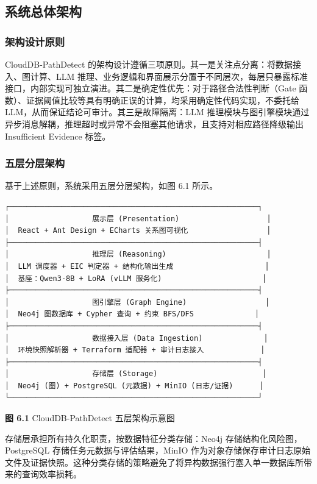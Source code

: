 \documentclass[a4paper,12pt]{ctexart}
\begin{document}
\subsection{系统总体架构}

\subsubsection{架构设计原则}

CloudDB-PathDetect 的架构设计遵循三项原则。其一是关注点分离：将数据接入、图计算、LLM 推理、业务逻辑和界面展示分置于不同层次，每层只暴露标准接口，内部实现可独立演进。其二是确定性优先：对于路径合法性判断（Gate 函数）、证据阈值比较等具有明确正误的计算，均采用确定性代码实现，不委托给 LLM，从而保证结论可审计。其三是故障隔离：LLM 推理模块与图引擎模块通过异步消息解耦，推理超时或异常不会阻塞其他请求，且支持对相应路径降级输出 Insufficient Evidence 标签。

\subsubsection{五层分层架构}

基于上述原则，系统采用五层分层架构，如图 6.1 所示。

\begin{verbatim}
┌─────────────────────────────────────────────────────────┐
│                   展示层 (Presentation)                    │
│  React + Ant Design + ECharts 关系图可视化                  │
├─────────────────────────────────────────────────────────┤
│                   推理层 (Reasoning)                       │
│  LLM 调度器 + EIC 判定器 + 结构化输出生成                     │
│  基座：Qwen3-8B + LoRA (vLLM 服务化)                       │
├─────────────────────────────────────────────────────────┤
│                   图引擎层 (Graph Engine)                  │
│  Neo4j 图数据库 + Cypher 查询 + 约束 BFS/DFS              │
├─────────────────────────────────────────────────────────┤
│                   数据接入层 (Data Ingestion)              │
│  环境快照解析器 + Terraform 适配器 + 审计日志接入             │
├─────────────────────────────────────────────────────────┤
│                   存储层 (Storage)                        │
│  Neo4j (图) + PostgreSQL (元数据) + MinIO (日志/证据)      │
└─────────────────────────────────────────────────────────┘
\end{verbatim}

\textbf{图 6.1} CloudDB-PathDetect 五层架构示意图

存储层承担所有持久化职责，按数据特征分类存储：Neo4j 存储结构化风险图，PostgreSQL 存储任务元数据与评估结果，MinIO 作为对象存储保存审计日志原始文件及证据快照。这种分类存储的策略避免了将异构数据强行塞入单一数据库所带来的查询效率损耗。
\end{document}
